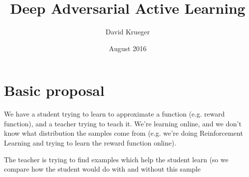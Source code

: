 \documentclass{article}
\title{Deep Adversarial Active Learning}
\author{David Krueger}
\date{August 2016}
\begin{document}
\maketitle

\section{Basic proposal}
We have a student trying to learn to approximate a function (e.g. reward function), and a teacher trying to teach it.
We're learning online, and we don't know what distribution the samples come from (e.g. we're doing Reinforcement Learning and trying to learn the reward function online).

The teacher is trying to find examples which help the student learn (so we compare how the student would do with and without this sample






%

\end{document}
